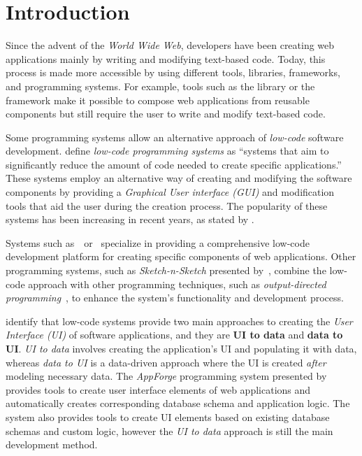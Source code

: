 \chapter*{Introduction}

Since the advent of the \emph{World Wide Web}, developers have been creating web applications mainly by writing and modifying text-based code.
Today, this process is made more accessible by using different tools, libraries, frameworks, and programming systems.
For example, tools such as the \citet{react} library or the \citet{vuejs} framework make it possible to compose web applications from reusable components but still require the user to write and modify text-based code.

Some programming systems allow an alternative approach of \emph{low-code} software development.
\citet{Pinho_Aguiar_Amaral_2023} define \emph{low-code programming systems} as ``systems that aim to significantly reduce the amount of code needed to create specific applications.''
These systems employ an alternative way of creating and modifying the software components by providing a \emph{Graphical User interface (GUI)} and modification tools that aid the user during the creation process.
The popularity of these systems has been increasing in recent years, as stated by \citet{Sahay_Indamutsa_Di}.

Systems such as~\citet{mendix}~or~\citet{darklang} specialize in providing a comprehensive low-code development platform for creating specific components of web applications.
Other programming systems, such as \emph{Sketch-n-Sketch} presented by~\citet{sketch-and-sketch}, combine the low-code approach
with other programming techniques, such as \emph{output-directed programming}~\cite{output-directed-programming}, to enhance the system's functionality and development process.

\citet{Sahay_Indamutsa_Di} identify that low-code systems provide two main approaches to creating the \emph{User Interface (UI)} of software applications, and they are \textbf{UI to data} and \textbf{data to UI}.
\emph{UI to data} involves creating the application's UI and populating it with data, whereas \emph{data to UI} is a data-driven approach where the UI is created \emph{after} modeling necessary data.
The \emph{AppForge} programming system presented by~\citet{Yang_Gupta_Botev_Churchill_Levchenko_Shanmugasundaram_2008} provides tools to create user interface elements of web applications and automatically creates corresponding database schema and application logic.
The system also provides tools to create UI elements based on existing database schemas and custom logic, however the \emph{UI to data} approach is still the main development method.

